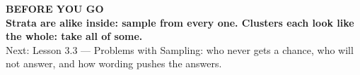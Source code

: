 \documentclass[aspectratio=169, 11pt]{beamer}
\begin{document}
{
\begin{frame}[plain]
  \vspace{1.5cm}\hspace{0.8cm}%
  \begin{minipage}{0.86\textwidth}
    {\color{goldacc}\bfseries\small BEFORE YOU GO}\\[0.7cm]
    {\color{white}\bfseries\Large Strata are alike inside: sample from every one. Clusters
    each look like the whole: take all of some.}\\[0.9cm]
    {\color{skymid}\small Next: Lesson 3.3 --- Problems with Sampling: who never gets a chance,
    who will not answer, and how wording pushes the answers.}
  \end{minipage}
\end{frame}
}
\end{document}
